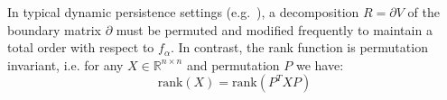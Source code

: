 \documentclass[10pt]{article}
\numberwithin{equation}{section}
\newcommand{\+}{%
	\raisebox{0.18ex}{\scaleobj{0.55}{+}}
}
\theoremstyle{definition}
\theoremstyle{definition}
\begin{document}
In typical dynamic persistence settings (e.g.~\cite{cohen2006vines}), a decomposition $R = \partial V$ of the boundary matrix $\partial$ must be permuted and modified frequently to maintain a total order with respect to $f_\alpha$.  %
In contrast, the rank function is permutation invariant, i.e. for any $X \in \mathbb{R}^{n \times n}$ and permutation $P$ we have: 
$$ \mathrm{rank}(X) = \mathrm{rank}(P^T X  P) $$
\end{document}
